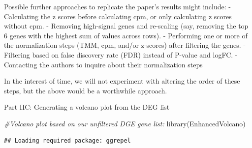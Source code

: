 \documentclass[
]{article}
\newenvironment{Shaded}{\begin{snugshade}}{\end{snugshade}}
\newcommand{\AttributeTok}[1]{\textcolor[rgb]{0.77,0.63,0.00}{#1}}
\newcommand{\CommentTok}[1]{\textcolor[rgb]{0.56,0.35,0.01}{\textit{#1}}}
\newcommand{\DecValTok}[1]{\textcolor[rgb]{0.00,0.00,0.81}{#1}}
\newcommand{\FloatTok}[1]{\textcolor[rgb]{0.00,0.00,0.81}{#1}}
\newcommand{\FunctionTok}[1]{\textcolor[rgb]{0.00,0.00,0.00}{#1}}
\newcommand{\NormalTok}[1]{#1}
\newcommand{\OtherTok}[1]{\textcolor[rgb]{0.56,0.35,0.01}{#1}}
\newcommand{\SpecialCharTok}[1]{\textcolor[rgb]{0.00,0.00,0.00}{#1}}
\newcommand{\StringTok}[1]{\textcolor[rgb]{0.31,0.60,0.02}{#1}}
\begin{document}
Possible further approaches to replicate the paper's results might
include: - Calculating the z scores before calculating cpm, or only
calculating z scores without cpm. - Removing high-signal genes and
re-scaling (say, removing the top 6 genes with the highest sum of values
across rows). - Performing one or more of the normalization steps (TMM,
cpm, and/or z-scores) after filtering the genes. - Filtering based on
false discovery rate (FDR) instead of P-value and logFC. - Contacting
the authors to inquire about their normalization steps

In the interest of time, we will not experiment with altering the order
of these steps, but the above would be a worthwhile approach.

Part IIC: Generating a volcano plot from the DEG list

\begin{Shaded}
\begin{Highlighting}[]
\CommentTok{\#Volcano plot based on our unfiltered DGE gene list:}
\FunctionTok{library}\NormalTok{(EnhancedVolcano)}
\end{Highlighting}
\end{Shaded}

\begin{verbatim}
## Loading required package: ggrepel
\end{verbatim}

\begin{Shaded}
\end{Shaded}
\end{document}
